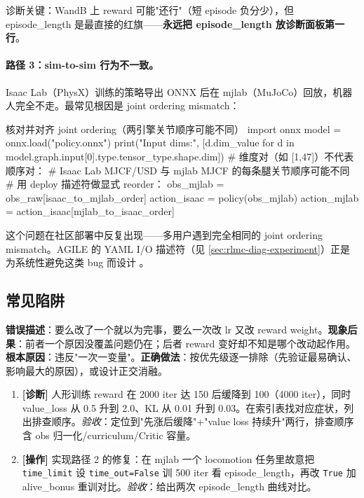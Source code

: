 诊断关键：WandB 上 reward 可能"还行"（短 episode 负分少），但 episode\_length 是最直接的红旗——\textbf{永远把 episode\_length 放诊断面板第一行}。

\paragraph{路径 3：sim-to-sim 行为不一致。}Isaac Lab（PhysX）训练的策略导出 ONNX 后在 mjlab（MuJoCo）回放，机器人完全不走。最常见根因是 joint ordering mismatch：

\begin{codebox}[Python]{核对并对齐 joint ordering（两引擎关节顺序可能不同）}
import onnx
model = onnx.load("policy.onnx")
print("Input dims:",
      [d.dim_value for d in model.graph.input[0].type.tensor_type.shape.dim])
# 维度对（如 [1,47]）不代表顺序对：
# Isaac Lab MJCF/USD 与 mjlab MJCF 的每条腿关节顺序可能不同
# 用 deploy 描述符做显式 reorder：
obs_mjlab     = obs_raw[isaac_to_mjlab_order]
action_isaac  = policy(obs_mjlab)
action_mjlab  = action_isaac[mjlab_to_isaac_order]
\end{codebox}

这个问题在社区部署中反复出现——多用户遇到完全相同的 joint ordering mismatch。AGILE 的 YAML I/O 描述符（见 \cref{sec:rlmc-diag-experiment}）正是为系统性避免这类 bug 而设计 \cite{nvidia2026agile}。

\subsection{常见陷阱}

\begin{pitfall}
\textbf{错误描述}：要么改了一个就以为完事，要么一次改 lr 又改 reward weight。\textbf{现象后果}：前者一个原因没覆盖问题仍在；后者 reward 变好却不知是哪个改动起作用。\textbf{根本原因}：违反"一次一变量"。\textbf{正确做法}：按优先级逐一排除（先验证最易确认、影响最大的原因），或设计正交消融。
\end{pitfall}

\begin{practice}[本节动手任务]
\begin{enumerate}
  \item \textbf{[诊断]} 人形训练 reward 在 2000 iter 达 150 后缓降到 100（4000 iter），同时 value\_loss 从 0.5 升到 2.0、KL 从 0.01 升到 0.03。在索引表找对应症状，列出排查顺序。\emph{验收}：定位到"先涨后缓降"+"value loss 持续升"两行，排查顺序含 obs 归一化/curriculum/Critic 容量。
  \item \textbf{[操作]} 实现路径 2 的修复：在 mjlab 一个 locomotion 任务里故意把 \verb|time_limit| 设 \verb|time_out=False| 训 500 iter 看 episode\_length，再改 \verb|True| 加 alive\_bonus 重训对比。\emph{验收}：给出两次 episode\_length 曲线对比。
\end{enumerate}
\end{practice}


